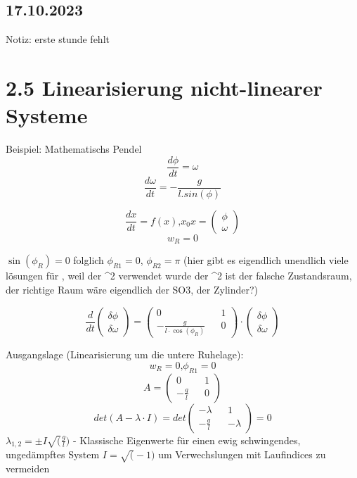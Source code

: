 \documentclass[a4paper]{article}
\begin{document}
\subsection*{17.10.2023}
Notiz: erste stunde fehlt

\section*{2.5 Linearisierung nicht-linearer Systeme}
Beispiel: Mathematischs Pendel
\[\frac{d\phi}{dt}= \omega\]
\[\frac{d\omega}{dt} = -\frac{g}{l.sin(\phi)}\]

\[\frac{dx}{dt} = f(x)\text{,} x_{0}  x=\begin{pmatrix} \phi\\ \omega\end{pmatrix}\]
 \[ w_{R}=0\]

 $\sin(\phi_{R})=0$ folglich $\phi_{R1}=0$, $\phi_{R2}=\pi$ (hier gibt es eigendlich unendlich viele lösungen für \phi, weil der \R^2 verwendet wurde
der \R^2 ist der falsche Zustandsraum, der richtige Raum wäre eigendlich der SO3, der Zylinder?)

\[\frac{d}{dt}\begin{pmatrix} \delta\phi\\ \delta\omega\end{pmatrix}=\begin{pmatrix}
0 && 1\\
-\frac{g}{l\cdot \cos(\phi_{R})} && 0
\end{pmatrix}
\cdot \begin{pmatrix} \delta\phi\\ \delta\omega\end{pmatrix}\]

Ausgangslage (Linearisierung um die untere Ruhelage):
\[ w_{R}=0\text{,} \phi_{R1}=0 \]
\[ A=\begin{pmatrix}
0 && 1\\
-\frac{g}{l} && 0
\end{pmatrix}\]
\[det(A-\lambda\cdot I)=det\begin{pmatrix}
-\lambda && 1\\
-\frac{g}{l} && -\lambda
\end{pmatrix} =0\]
$\lambda_{1,2}=\pm I\sqrt(\frac{g}{l})$  - Klassische Eigenwerte für einen ewig schwingendes, ungedämpftes System
$I=\sqrt(-1)$  um Verwechslungen mit Laufindices zu vermeiden
\end{document}
